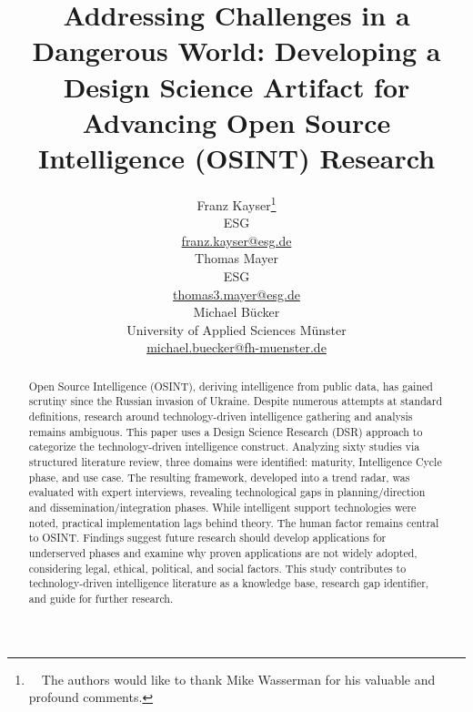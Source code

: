 \documentclass[10pt]{article}
\title{Addressing Challenges in a Dangerous World: Developing a Design Science Artifact for Advancing Open Source Intelligence (OSINT) Research}
\author{Franz Kayser\thanks{~~The authors would like to thank Mike Wasserman for his valuable and profound comments.} \\
 ESG \\
 {\underline{ franz.kayser@esg.de}} \\\And
 Thomas Mayer \\
 ESG  \\
 {\underline{ thomas3.mayer@esg.de} }\\\And 
 Michael Bücker \\
University of Applied Sciences Münster\\
 {\underline{michael.buecker@fh-muenster.de}} \\}
\date{}
\begin{document}
\maketitle
\begin{abstract}
    Open Source Intelligence (OSINT), deriving intelligence from public data, has gained scrutiny since the Russian invasion of Ukraine. Despite numerous attempts at standard definitions, research around technology-driven intelligence gathering and analysis remains ambiguous. This paper uses a Design Science Research (DSR) approach to categorize the technology-driven intelligence construct. Analyzing sixty studies via structured literature review, three domains were identified: maturity, Intelligence Cycle phase, and use case. The resulting framework, developed into a trend radar, was evaluated with expert interviews, revealing technological gaps in planning/direction and dissemination/integration phases. While intelligent support technologies were noted, practical implementation lags behind theory. The human factor remains central to OSINT. Findings suggest future research should develop applications for underserved phases and examine why proven applications are not widely adopted, considering legal, ethical, political, and social factors. This study contributes to technology-driven intelligence literature as a knowledge base, research gap identifier, and guide for further research.
\end{abstract}
\end{document}
